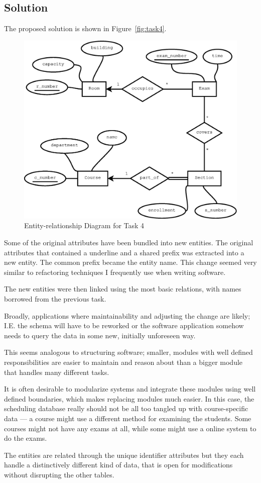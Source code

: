 \subsection{Solution}
The proposed solution is shown in Figure~\ref{fig:task4}.

\begin{figure}[htbp]
  \centering
  \includegraphics[width=\linewidth]{include/task4.eps}
    \caption{Entity-relationship Diagram for Task 4}
  \label{fig:task3}
\end{figure}

Some of the original attributes have been bundled into new entities. The
original attributes that contained a underline and a shared prefix was
extracted into a new entity. The common prefix became the entity name. This
change seemed very similar to refactoring techniques I frequently use when
writing software.

The new entities were then linked using the most basic relations, with names
borrowed from the previous task.

Broadly, applications where maintainability and adjusting the change are
likely; I.E. the schema will have to be reworked or the software application
somehow needs to query the data in some new, initially unforeseen way.

This seems analogous to structuring software; smaller, modules with well
defined responsibilities are easier to maintain and reason about than a bigger
module that handles many different tasks.

It is often desirable to modularize systems and integrate these modules using
well defined boundaries, which makes replacing modules much easier.
In this case, the scheduling database really should not be all too tangled up
with course-specific data --- a course might use a different method for
examining the students. Some courses might not have any exams at all, while
some might use a online system to do the exams.

The entities are related through the unique identifier attributes but they each
handle a distinctively different kind of data, that is open for modifications
without disrupting the other tables.
